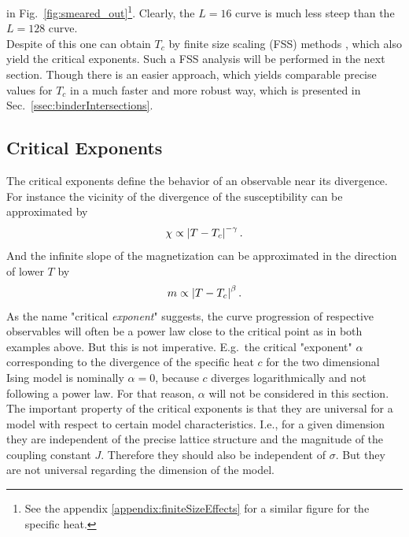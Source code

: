     in Fig.\ \ref{fig:smeared_out}\footnote{See the appendix \ref{appendix:finiteSizeEffects} for a similar figure for the specific heat.}.
    Clearly, the \(L=16\) curve is much less steep than the \(L=128\) curve.\\
    Despite of this one can obtain \(T_c\) by finite size scaling (FSS)
    methods \cite[p. 232ff]{NewmanBarkema1999}, which also yield the critical
    exponents. Such a FSS analysis will be performed in the next section.
    Though there is an easier approach, which yields comparable precise
    values for \(T_{c}\) in a much faster and more robust way, which is
    presented in Sec.\ \ref{ssec:binderIntersections}.

\subsection{Critical Exponents}
\label{ssec:critExp}
    The critical exponents define the behavior of an observable near its
    divergence. For instance the vicinity of the divergence of the susceptibility
    can be approximated by
    \begin{equation}
        \chi \propto \left\vert T-T_{c}\right\vert^{-\gamma}.
        \label{eq:critExp:gamma}
    \end{equation}
    And the infinite slope of the magnetization can be approximated in
    the direction of lower \(T\) by
    \begin{equation}
        m \propto \left\vert T-T_{c}\right\vert^{\beta}.
        \label{eq:critExp:beta}
    \end{equation}
    As the name "critical \emph{exponent}" suggests, the curve progression
    of respective observables will often be a power law close to the critical
    point as in both examples above. But this is not imperative.
    E.g.\ the critical "exponent" \(\alpha\) corresponding to the divergence of
    the specific heat \(c\) for the two dimensional Ising model is nominally \(\alpha = 0\),
    because \(c\) diverges logarithmically and not following a power law.
    For that reason, \(\alpha\) will not be considered in this section.\\
    The important property of the critical exponents is that they are
    universal for a model with respect to certain model characteristics.
    I.e., for a given dimension they are independent of the precise lattice
    structure and the magnitude of the coupling constant \(J\).
    Therefore they should also be independent of \(\sigma\). But they are
    not universal regarding the dimension of the model.
